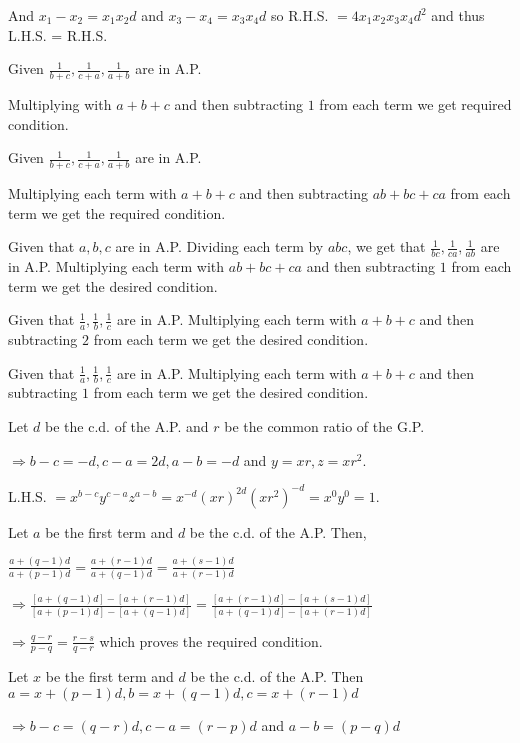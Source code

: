  And $x_1 - x_2 = x_1x_2d$ and $x_3 - x_4 = x_3x_4d$ so R.H.S. $= 4x_1x_2x_3x_4d^2$ and thus L.H.S. =
  R.H.S.
\item Given $\frac{1}{b + c}, \frac{1}{c + a}, \frac{1}{a + b}$ are in A.P.

  Multiplying with $a + b + c$ and then subtracting $1$ from each term we get required condition.
\item Given $\frac{1}{b + c}, \frac{1}{c + a}, \frac{1}{a + b}$ are in A.P.

  Multiplying each term with $a + b+ c$ and then subtracting $ab + bc + ca$ from each term we get the
  required condition.
\item Given that $a, b, c$ are in A.P. Dividing each term by $abc$, we get that $\frac{1}{bc}, \frac{1}{ca},
  \frac{1}{ab}$ are in A.P. Multiplying each term with $ab + bc + ca$ and then subtracting $1$ from each
  term we get the desired condition.
\item Given that $\frac{1}{a}, \frac{1}{b}, \frac{1}{c}$ are in A.P. Multiplying each term with $a + b + c$
  and then subtracting $2$ from each term we get the desired condition.
\item Given that $\frac{1}{a}, \frac{1}{b}, \frac{1}{c}$ are in A.P. Multiplying each term with $a + b + c$
  and then subtracting $1$ from each term we get the desired condition.
\item Let $d$ be the c.d. of the A.P. and $r$ be the common ratio of the G.P.

  $\Rightarrow b - c = -d, c - a = 2d, a - b = -d$ and $y = xr, z = xr^2$.

  L.H.S. $= x^{b - c}y^{c - a}z^{a - b} = x^{-d}(xr)^{2d}(xr^2)^{-d} = x^0y^0 = 1$.
\item Let $a$ be the first term and $d$ be the c.d. of the A.P. Then,

  $\frac{a + (q - 1)d}{a + (p - 1)d} = \frac{a + (r - 1)d}{a + (q - 1)d} = \frac{a + (s - 1)d}{a + (r -
  1)d}$

  $\Rightarrow \frac{[a + (q - 1)d] - [a + (r - 1)d]}{[a + (p - 1)d] - [a + (q - 1)d]} = \frac{[a + (r -
    1)d] - [a + (s - 1)d]}{[a + (q - 1)d] - [a + (r - 1)d]}$

  $\Rightarrow \frac{q - r}{p - q} = \frac{r - s}{q - r}$ which proves the required condition.
\item Let $x$ be the first term and $d$ be the c.d. of the A.P. Then $a = x + (p - 1)d, b = x + (q - 1)d, c
  = x + (r - 1)d$

  $\Rightarrow b - c = (q - r)d, c - a = (r - p)d$ and $a - b = (p - q)d$

